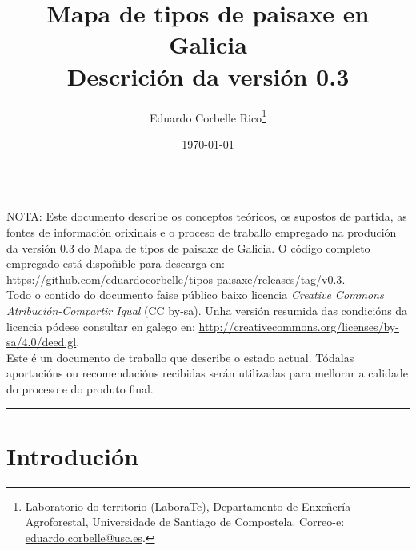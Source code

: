 \documentclass[11pt,a4paper]{article}
\title{Mapa de tipos de paisaxe en Galicia\\Descrición da versión 0.3}
\author{Eduardo Corbelle Rico\thanks{Laboratorio do territorio (LaboraTe), Departamento de Enxeñería Agroforestal, Universidade de Santiago de Compostela. Correo-e: \href{mailto:eduardo.corbelle@usc.es}{eduardo.corbelle@usc.es}.}}
\date{\today}
\begin{document}
\maketitle

\hrule
 \vspace{.2cm}
  \begin{footnotesize}
   \noindent NOTA: Este documento describe os conceptos teóricos, os supostos de partida, as fontes de información orixinais e o proceso de traballo empregado na produción da versión 0.3 do Mapa de tipos de paisaxe de Galicia. O código completo empregado está dispoñible para descarga en: \url{https://github.com/eduardocorbelle/tipos-paisaxe/releases/tag/v0.3}.\\   
Todo o contido do documento faise público baixo licencia \emph{Creative Commons Atribución-Compartir Igual} (CC by-sa). Unha versión resumida das condicións da licencia pódese consultar en galego en: \url{http://creativecommons.org/licenses/by-sa/4.0/deed.gl}.\\
Este é un documento de traballo que describe o estado actual. Tódalas aportacións ou recomendacións recibidas serán utilizadas para mellorar a calidade do proceso e do produto final.
  \end{footnotesize}
 \vspace{.2cm}
\hrule
\bigskip

\section{Introdución}
\end{document}
